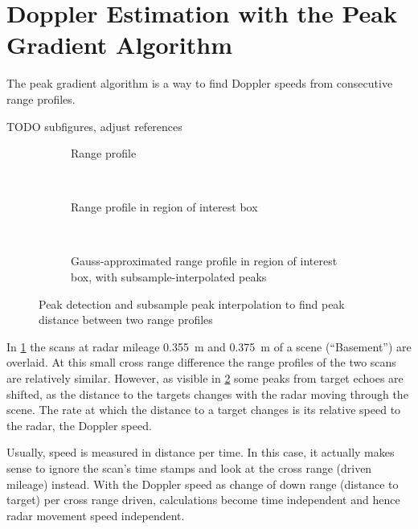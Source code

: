 \section{Doppler Estimation with the Peak Gradient Algorithm}\label{doppler-estimation-with-the-peak-gradient-algorithm}

The peak gradient algorithm is a way to find Doppler speeds from
consecutive range profiles.

TODO subfigures, adjust references
\the\textwidth

\begin{figure}[htbp]
    \centering
    \begin{subfigure}[t]{\textwidth}
        \def\svgscale{1}
        
        \caption{Range profile}
        \label{fig:explain_peak_gradient_1}
    \end{subfigure}\bigskip\\
    \begin{subfigure}[t]{\textwidth}
        \def\svgscale{1}
        
        \caption{Range profile in region of interest box}
        \label{fig:explain_peak_gradient_2}
    \end{subfigure}\bigskip\\
    \begin{subfigure}[t]{\textwidth}
        \def\svgscale{1}
        
        \caption{Gauss-approximated range profile in region of interest box, with subsample-interpolated peaks}
        \label{fig:explain_peak_gradient_3}
    \end{subfigure}\bigskip
    \caption{Peak detection and subsample peak interpolation to find peak distance between two range profiles}
    \label{fig:fig_explain_peak_gradient}
\end{figure}

In \cref{fig:explain_peak_gradient_1} the scans at radar mileage \SI{0.355}{m} and \SI{0.375}{m} of a scene (``Basement'') are overlaid. At this small cross range difference the range profiles of the two scans are relatively similar. However, as visible in \cref{fig:explain_peak_gradient_2} some peaks from target echoes are shifted, as the distance to the targets changes with the radar moving through the scene. The rate at which the distance to a target changes is its relative speed to the radar, the Doppler speed.

Usually, speed is measured in distance per time. In this case, it
actually makes sense to ignore the scan's time stamps and look at the
cross range (driven mileage) instead. With the Doppler speed as change
of down range (distance to target) per cross range driven, calculations
become time independent and hence radar movement speed independent.

